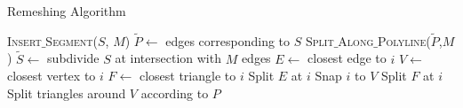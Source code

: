 \begin{algorithm}[hp]
\caption[Frame-based cutting: Remeshing algorithm]{\label{alg:remeshing}Remeshing Algorithm}
\begin{algorithmic}[1]
\State \textsc{Insert$\_$Segment}($S$, $M$)
\State $\tilde{P} \gets$ edges corresponding to $S$
\State \textsc{Split$\_$Along$\_$Polyline}($\tilde{P}$,$M$)
\EndProcedure
\State
{}
\State $\tilde{S} \gets$ subdivide $S$ at intersection with $M$ edges
\State $E \gets$ closest edge to $i$
\State $V \gets$ closest vertex to $i$
\State $F \gets$ closest triangle to $i$
\State Split $E$ at $i$
\State Snap $i$ to $V$
\Else
\State Split $F$ at $i$
\EndIf
\EndFor
\EndProcedure
\State
{}
\State Split triangles around $V$ according to $P$
\EndFor
\EndProcedure
\end{algorithmic}
\end{algorithm}

\clearpage 


